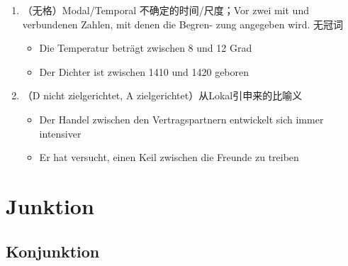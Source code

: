 \documentclass[UTF8]{report}
\begin{document}
\begin{enumerate}
\begin{enumerate}
\begin{itemize}
\begin{figure}[H]
            \end{figure}
        \end{itemize}
    \end{enumerate}
    \item （无格）Modal/Temporal 不确定的时间/尺度；Vor zwei mit und verbundenen Zahlen, mit denen die Begren- zung angegeben wird. 无冠词
    \begin{itemize}
        \item Die Temperatur beträgt zwischen 8 und 12 Grad
        \item Der Dichter ist zwischen 1410 und 1420 geboren
    \end{itemize}
    \item（D nicht zielgerichtet, A zielgerichtet）从Lokal引申来的比喻义
    \begin{itemize}
        \item Der Handel zwischen den Vertragspartnern entwickelt sich immer intensiver
        \item Er hat versucht, einen Keil zwischen die Freunde zu treiben
    \end{itemize}
\end{enumerate}

\chapter{Junktion}


\section{Konjunktion}
\end{document}
